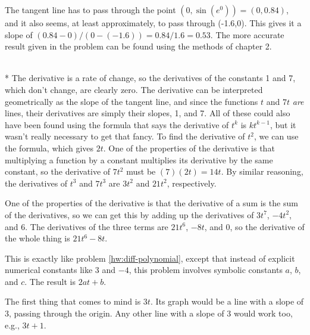 
The tangent line has to pass through the point $(0,\sin(e^0))=(0,0.84)$, and it also seems, at least approximately, to pass
through (-1.6,0). This gives it a slope of $(0.84-0)/(0-(-1.6))=0.84/1.6=0.53$. The more accurate result given in the problem
can be found using the methods of chapter 2.


\pagebreak[4]

\\*
The derivative is a rate of change, so the derivatives of the constants 1 and 7, which don't change, are
clearly zero. The derivative can be interpreted geometrically as the slope of the tangent line, and since
the functions $t$ and $7t$ \emph{are} lines, their derivatives are simply their slopes, 1, and 7. 
All of these could also have been found using the formula that says the derivative of $t^k$ is
$kt^{k-1}$, but it wasn't really necessary to get that fancy.
To find the derivative of $t^2$, we can use the formula, which gives $2t$. One of the properties of
the derivative is that multiplying a function by a constant multiplies its derivative by the same
constant, so the derivative of $7t^2$ must be $(7)(2t)=14t$. By similar reasoning, the derivatives
of $t^3$ and $7t^3$ are $3t^2$ and $21t^2$, respectively.


One of the properties of the derivative is that the derivative of a sum is the sum of the derivatives,
so we can get this by adding up the derivatives of $3t^7$, $-4t^2$, and 6. The derivatives of the
three terms are $21t^6$, $-8t$, and 0, so the derivative of the whole thing is $21t^6-8t$.


This is exactly like problem \ref{hw:diff-polynomial}, except that instead of explicit
numerical constants like 3 and $-4$, this problem involves symbolic constants $a$, $b$, and
$c$. The result is $2at+b$.


The first thing that comes to mind is $3t$. Its graph would be a line with a slope of 3,
passing through the origin. Any other line with a slope of 3 would work too, e.g.,
$3t+1$.

